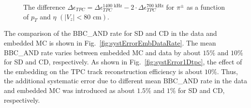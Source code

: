 \begin{figure}[H]
{	}%
	\caption[The difference $\Delta\epsilon_{ TPC} =\Delta\epsilon_{ TPC}^{1400\text{ kHz}}-2\cdot\Delta\epsilon_{ TPC}^{700\text{ kHz}}$ for $\pi^\pm$ as a function of $p_T$ and $\eta$ $\left(|V_z|<80\text{ cm}\right)$]{The difference $\Delta\epsilon_{ TPC} =\Delta\epsilon_{ TPC}^{1400\text{ kHz}}-2\cdot\Delta\epsilon_{ TPC}^{700\text{ kHz}}$ for $\pi^\pm$ as a function of $p_T$ and $\eta$ $\left(|V_z|<80\text{ cm}\right)$. }
	\label{fig:systError2Dtpc}
\end{figure}



The comparison of the BBC\_AND rate for SD and CD in the data and embedded MC is shown in Fig.~\ref{fig:systErrorEmbDataRate}. The mean BBC\_AND rate varies between embedded MC and data by about  $15\%$ and $10\%$ for SD and CD, respectively. As shown in Fig.~\ref{fig:systError1Dtpc}, 
the effect of the embedding on the TPC track reconstruction efficiency is about $10\%$.  Thus, the additional systematic error due to different mean BBC\_AND rate in the data and embedded MC was introduced as about $1.5\%$ and $1\%$ for SD and CD, respectively.
	

